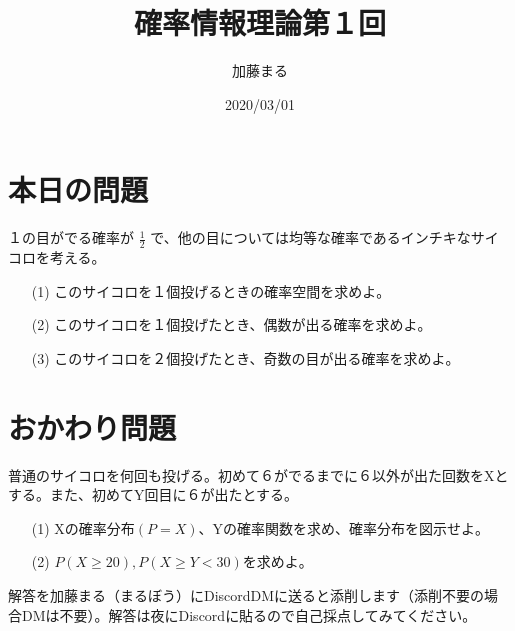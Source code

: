 \documentclass[a4j,uplatex]{jsarticle}
\title{確率情報理論第１回}
\author{加藤まる}
\date{2020/03/01}
\begin{document}
\maketitle
\section*{本日の問題}

１の目がでる確率が $\frac{1}{2}$ で、他の目については均等な確率であるインチキなサイコロを考える。
\begin{itemize}
  \item[(1)] このサイコロを１個投げるときの確率空間を求めよ。 
  \item[(2)] このサイコロを１個投げたとき、偶数が出る確率を求めよ。
  \item[(3)] このサイコロを２個投げたとき、奇数の目が出る確率を求めよ。 
\end{itemize}

\section*{おかわり問題}
普通のサイコロを何回も投げる。初めて６がでるまでに６以外が出た回数をXとする。また、初めてY回目に６が出たとする。
\begin{itemize}
  \item[(1)] Xの確率分布$(P=X)$、Yの確率関数を求め、確率分布を図示せよ。
  \item[(2)] $ P(X\ge20) , P(X\ge Y<30) $を求めよ。 
\end{itemize}

解答を加藤まる（まるぼう）にDiscordDMに送ると添削します（添削不要の場合DMは不要）。解答は夜にDiscordに貼るので自己採点してみてください。
\end{document}
